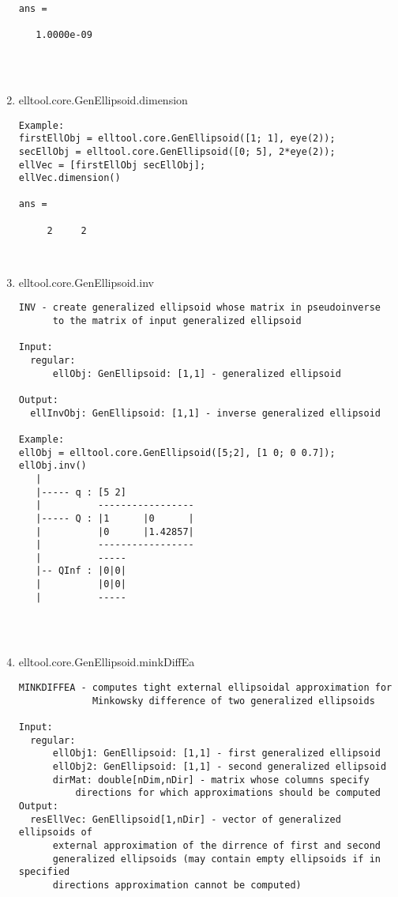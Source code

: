 \begin{enumerate}
\begin{lstlisting}
ans =

   1.0000e-09




\end{lstlisting}
\fontfamily{\familydefault}
\selectfont
\item {elltool.core.GenEllipsoid.dimension}
\selectfont
\begin{lstlisting}
Example:
firstEllObj = elltool.core.GenEllipsoid([1; 1], eye(2));
secEllObj = elltool.core.GenEllipsoid([0; 5], 2*eye(2));
ellVec = [firstEllObj secEllObj];
ellVec.dimension()

ans =

     2     2



\end{lstlisting}
\fontfamily{\familydefault}
\selectfont
\item {elltool.core.GenEllipsoid.inv}
\selectfont
\begin{lstlisting}
INV - create generalized ellipsoid whose matrix in pseudoinverse
      to the matrix of input generalized ellipsoid

Input:
  regular:
      ellObj: GenEllipsoid: [1,1] - generalized ellipsoid

Output:
  ellInvObj: GenEllipsoid: [1,1] - inverse generalized ellipsoid

Example:
ellObj = elltool.core.GenEllipsoid([5;2], [1 0; 0 0.7]);
ellObj.inv()
   |
   |----- q : [5 2]
   |          -----------------
   |----- Q : |1      |0      |
   |          |0      |1.42857|
   |          -----------------
   |          -----
   |-- QInf : |0|0|
   |          |0|0|
   |          -----




\end{lstlisting}
\fontfamily{\familydefault}
\selectfont
\item {elltool.core.GenEllipsoid.minkDiffEa}
\selectfont
\begin{lstlisting}
MINKDIFFEA - computes tight external ellipsoidal approximation for
             Minkowsky difference of two generalized ellipsoids

Input:
  regular:
      ellObj1: GenEllipsoid: [1,1] - first generalized ellipsoid
      ellObj2: GenEllipsoid: [1,1] - second generalized ellipsoid
      dirMat: double[nDim,nDir] - matrix whose columns specify
          directions for which approximations should be computed
Output:
  resEllVec: GenEllipsoid[1,nDir] - vector of generalized ellipsoids of
      external approximation of the dirrence of first and second
      generalized ellipsoids (may contain empty ellipsoids if in specified
      directions approximation cannot be computed)


\end{lstlisting}
\end{enumerate}
